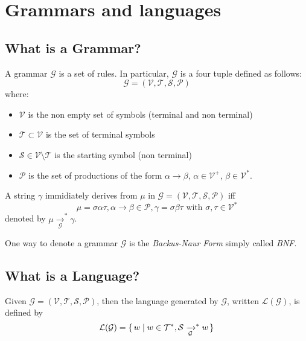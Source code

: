 \chapter{Grammars and languages}

\section{What is a Grammar?}

A grammar $\mathcal{G}$ is a set of rules. In particular, $\mathcal{G}$ is a four tuple defined as follows:
\begin{equation}
\mathcal{G} = (\mathcal{V}, \mathcal{T}, \mathcal{S}, \mathcal{P})
\end{equation}
where:
\begin{itemize}
\item $\mathcal{V}$ is the non empty set of symbols (terminal and non terminal)
\item $\mathcal{T} \subset \mathcal{V}$ is the set of terminal symbols
\item $\mathcal{S} \in \mathcal{V} \setminus \mathcal{T}$ is the starting symbol (non terminal)
\item $\mathcal{P}$ is the set of productions of the form $\alpha \rightarrow \beta$, $\alpha \in \mathcal{V}^+$, $\beta \in \mathcal{V}^*$.
\end{itemize}
\noindent
A string $\gamma$ immidiately derives from $\mu$ in $\mathcal{G} = (\mathcal{V}, \mathcal{T}, \mathcal{S}, \mathcal{P})$ iff
\begin{equation}
\mu = \sigma \alpha \tau, \alpha \rightarrow \beta \in \mathcal{P}, \gamma = \sigma \beta \tau \text{ with } \sigma,\tau \in \mathcal{V}^*
\end{equation}
denoted by $\mu \xrightarrow[\mathcal{G}]{}^* \gamma$.

\noindent
One way to denote a grammar $\mathcal{G}$ is the \textit{Backus-Naur Form} simply called \textit{BNF}.


\section{What is a Language?}
Given $\mathcal{G} = (\mathcal{V}, \mathcal{T}, \mathcal{S}, \mathcal{P})$, then the language generated by $\mathcal{G}$, written $\mathcal{L(G)}$, is defined by
\[
\mathcal{L(G)} = \set{ w | w \in \mathcal{T}^*, \mathcal{S} \xrightarrow[\mathcal{G}]{}^* w }
\]

